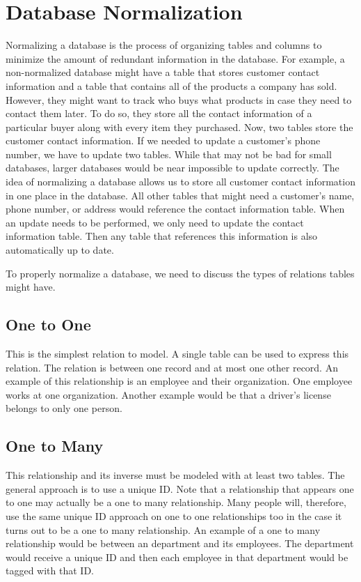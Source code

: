 \renewcommand{\lsql}[1]{\lstinline[language=SQL,prebreak=]!#1!}

\label{lab:advancedsql}

\section*{Database Normalization}
Normalizing a database is the process of organizing tables and columns to minimize the amount of redundant information in the database.
For example, a non-normalized database might have a table that stores customer contact information and a table that contains all of the products a company has sold.
However, they might want to track who buys what products in case they need to contact them later. To do so, they store all the contact information of a particular buyer along with every item they purchased.
Now, two tables store the customer contact information.
If we needed to update a customer's phone number, we have to update two tables.
While that may not be bad for small databases, larger databases would be near impossible to update correctly.
The idea of normalizing a database allows us to store all customer contact information in one place in the database.
All other tables that might need a customer's name, phone number, or address would reference the contact information table.
When an update needs to be performed, we only need to update the contact information table.
Then any table that references this information is also automatically up to date.

To properly normalize a database, we need to discuss the types of relations tables might have.
\subsection*{One to One}
This is the simplest relation to model.
A single table can be used to express this relation.
The relation is between one record and at most one other record.
An example of this relationship is an employee and their organization.
One employee works at one organization.
Another example would be that a driver's license belongs to only one person.

\subsection*{One to Many}
This relationship and its inverse must be modeled with at least two tables.
The general approach is to use a unique ID.
Note that a relationship that appears one to one may actually be a one to many relationship.
Many people will, therefore, use the same unique ID approach on one to one relationships too in the case it turns out to be a one to many relationship.
An example of a one to many relationship would be between an department and its employees.
The department would receive a unique ID and then each employee in that department would be tagged with that ID.

